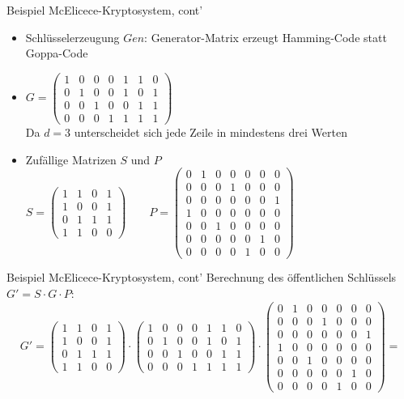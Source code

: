 \documentclass[11pt%
,aspectratio=169%
]{beamer}
\begin{document}
\begin{frame}{Beispiel McElicece-Kryptosystem, cont'}
    \begin{itemize}
        \item Schlüsselerzeugung $Gen$: Generator-Matrix erzeugt Hamming-Code statt Goppa-Code
        \item $G=\begin{pmatrix} 1 & 0 & 0 & 0 & 1 & 1 & 0 \\ 0 & 1 & 0 & 0 & 1 & 0 & 1 \\ 0 & 0 & 1 & 0 & 0 & 1 & 1 \\ 0 & 0 & 0 & 1 & 1 & 1 & 1 
        \end{pmatrix}$\\
        Da $d=3$ unterscheidet sich jede Zeile in mindestens drei Werten
        \item Zufällige Matrizen $S$ und $P$
        $S=\begin{pmatrix} 1 & 1 & 0 & 1 \\ 1 & 0 & 0 & 1 \\ 0 & 1 & 1 & 1 \\ 1 & 1 & 0 & 0 \end{pmatrix} \qquad
        P=\begin{pmatrix} 0 & 1 & 0 & 0 & 0 & 0 & 0 \\ 0 & 0 & 0 & 1 & 0 & 0 & 0 \\ 0 & 0 & 0 & 0 & 0 & 0 & 1 \\ 1 & 0 & 0 & 0 & 0 & 0 & 0 \\ 0 & 0 & 1 & 0 & 0 & 0 & 0 \\ 0 & 0 & 0 & 0 & 0 & 1 & 0 \\ 0 & 0 & 0 & 0 & 1 & 0 & 0 \end{pmatrix}$
    \end{itemize}
\end{frame}

\begin{frame}{Beispiel McElicece-Kryptosystem, cont'}
Berechnung des öffentlichen Schlüssels $G' = S \cdot G \cdot P$:
$$
    G'=\begin{pmatrix} 1 & 1 & 0 & 1 \\ 1 & 0 & 0 & 1 \\ 0 & 1 & 1 & 1 \\ 1 & 1 & 0 & 0 \end{pmatrix} \cdot \begin{pmatrix} 1 & 0 & 0 & 0 & 1 & 1 & 0 \\ 0 & 1 & 0 & 0 & 1 & 0 & 1 \\ 0 & 0 & 1 & 0 & 0 & 1 & 1 \\ 0 & 0 & 0 & 1 & 1 & 1 & 1 \end{pmatrix} \cdot \begin{pmatrix} 0 & 1 & 0 & 0 & 0 & 0 & 0 \\ 0 & 0 & 0 & 1 & 0 & 0 & 0 \\ 0 & 0 & 0 & 0 & 0 & 0 & 1 \\ 1 & 0 & 0 & 0 & 0 & 0 & 0 \\ 0 & 0 & 1 & 0 & 0 & 0 & 0 \\ 0 & 0 & 0 & 0 & 0 & 1 & 0 \\ 0 & 0 & 0 & 0 & 1 & 0 & 0 \end{pmatrix}=
$$
\end{frame}
\end{document}
